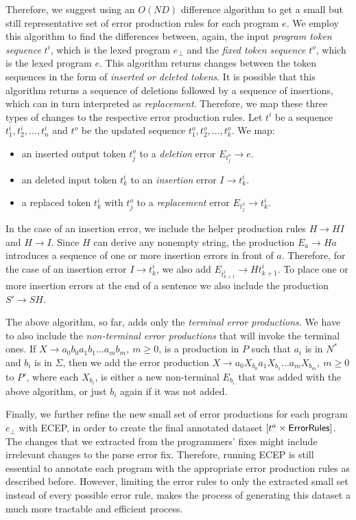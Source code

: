 Therefore, we suggest using an $O(ND)$ difference algorithm to get a small but
still representative set of error production rules for each program $e$. We
employ this algorithm to find the differences between, again, the input
\emph{program token sequence} $t^i$, which is the lexed program $e_{\bot}$ and
the \emph{fixed token sequence} $t^o$, which is the lexed program $e$. This
algorithm returns changes between the token sequences in the form of
\emph{inserted or deleted tokens}. It is possible that this algorithm returns a
sequence of deletions followed by a sequence of insertions, which can in turn
interpreted as \emph{replacement}. Therefore, we map these three types of
changes to the respective error production rules. Let $t^i$ be a sequence
$t^i_1, t^i_2, \dots, t^i_n$ and $t^o$ be the updated sequence $t^o_1, t^o_2,
\dots, t^o_k$. We map:
\begin{itemize}
    \item an inserted output token $t^o_j$ to a \emph{deletion} error $E_{t^o_j}
    \rightarrow e$.
    \item an deleted input token $t^i_k$ to an \emph{insertion} error $I
    \rightarrow t^i_k$.
    \item a replaced token $t^i_k$ with $t^o_j$ to a \emph{replacement} error
    $E_{t^o_j} \rightarrow t^i_k$.
\end{itemize}

In the case of an insertion error, we include the helper production rules $H
\rightarrow HI$ and $H \rightarrow I$. Since $H$ can derive any nonempty string,
the production $E_a \rightarrow Ha$ introduces a sequence of one or more
insertion errors in front of $a$. Therefore, for the case of an insertion error
$I \rightarrow t^i_k$, we also add $E_{t^i_{k+1}} \rightarrow Ht^i_{k+1}$. To
place one or more insertion errors at the end of a sentence we also include the
production $S' \rightarrow SH$.

The above algorithm, so far, adds only the \emph{terminal error productions}. We
have to also include the \emph{non-terminal error productions} that will invoke
the terminal ones. If $X \rightarrow a_0b_0a_1b_1 \dots a_mb_m,\ m \geq 0$, is a
production in $P$ such that $a_i$ is in $N^*$ and $b_i$ is in $\Sigma$, then we
add the error production $X \rightarrow a_0X_{b_0}a_1X_{b_1} \dots a_mX_{b_m},\
m \geq 0$ to $P'$, where each $X_{b_i}$, is either a new non-terminal $E_{b_i}$
that was added with the above algorithm, or just $b_i$ again if it was not
added.

Finally, we further refine the new small set of error productions for each
program $e_{\bot}$ with ECEP, in order to create the final annotated dataset
$[t^a \times \mathsf{ErrorRules}]$. The changes that we extracted from the
programmers' fixes might include irrelevant changes to the parse error fix.
Therefore, running ECEP is still essential to annotate each program with the
appropriate error production rules as described before. However, limiting the
error rules to only the extracted small set instead of every possible error
rule, makes the process of generating this dataset a much more tractable and
efficient process.


